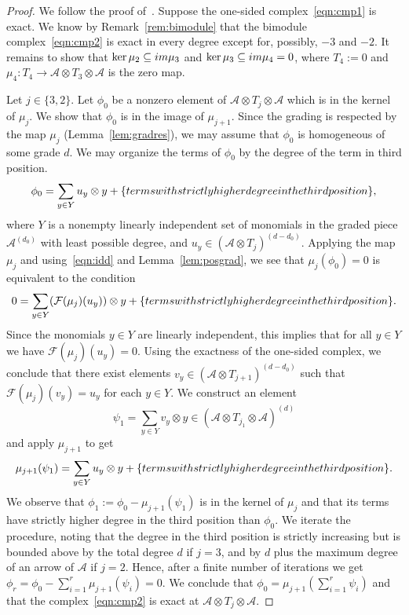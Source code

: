 \documentclass{article}
\theoremstyle{definition}
\newcommand{\A}{{\mathcal A}}
\newcommand{\F}{\mathcal F}
\begin{document}
\begin{proof}
	We follow the proof of~\cite[Proposition 7.5]{XBroomhead2009}.
	Suppose the one-sided complex~\eqref{eqn:cmp1} is exact. 
	We know by Remark~\ref{rem:bimodule} that the bimodule complex~\eqref{eqn:cmp2} is exact in every degree except for, possibly, $-3$ and $-2$. It remains to show that $\ker\mu_2\subseteq\textup{\textup{im}}\mu_3$ and $\ker\mu_3\subseteq\textup{im}\mu_4=0$, where $T_4:=0$ and $\mu_4:T_4\to \A\otimes T_3\otimes \A$ is the zero map.

	Let $j\in\{3,2\}$.
	Let $\phi_0$ be a nonzero element of $\A\otimes T_j\otimes \A$ which is in the kernel of $\mu_j$. We show that $\phi_0$ is in the image of $\mu_{j+1}$. Since the grading is respected by the map $\mu_j$ (Lemma~\ref{lem:gradres}), we may assume that $\phi_0$ is homogeneous of some grade $d$. We may organize the terms of $\phi_0$ by the degree of the term in third position.
	\[\phi_0=\sum_{y\in Y}u_y\otimes y+\{\textup{terms with strictly higher degree in the third position}\},\]
	where $Y$ is a nonempty linearly independent set of monomials in the graded piece $\A^{(d_0)}$ with least possible degree, and $u_y\in(\A\otimes T_j)^{(d-d_0)}$. 
	Applying the map $\mu_j$ and using~\eqref{eqn:idd} and Lemma~\ref{lem:posgrad}, we see that $\mu_j(\phi_0)=0$ is equivalent to the condition
	\[0=\sum_{y\in Y}(\F(\mu_j)(u_y))\otimes y+\{\textup{terms with strictly higher degree in the third position}\}.\]
	Since the monomials $y\in Y$ are linearly independent, this implies that for all $y\in Y$ we have $\mathcal F(\mu_j)(u_y)=0$. 
	Using the exactness of the one-sided complex, we conclude that there exist elements $v_y\in(\A\otimes T_{j+1})^{(d-d_0)}$ such that $\F(\mu_j)(v_y)=u_y$ for each $y\in Y$. We construct an element
	\[\psi_1=\sum_{y\in Y}v_y\otimes y\in(\A\otimes T_{j_1}\otimes\A)^{(d)}\]
	and apply $\mu_{j+1}$ to get
	\[\mu_{j+1}(\psi_1)=\sum_{y\in Y}u_y\otimes y+\{\textup{terms with strictly higher degree in the third position}\}.\]
	We observe that $\phi_1:=\phi_0-\mu_{j+1}(\psi_1)$ is in the kernel of $\mu_{j}$ and that its terms have strictly higher degree in the third position than $\phi_0$. We iterate the procedure, noting that the degree in the third position is strictly increasing but is bounded above by the total degree $d$ if $j=3$, and by $d$ plus the maximum degree of an arrow of $\A$ if $j=2$. Hence, after a finite number of iterations we get $\phi_r=\phi_0-\sum_{i=1}^r\mu_{j+1}(\psi_i)=0$. We conclude that $\phi_0=\mu_{j+1}(\sum_{i=1}^r\psi_i)$ and that the complex~\eqref{eqn:cmp2} is exact at $\A\otimes T_j\otimes \A$.
\end{proof}
\end{document}
